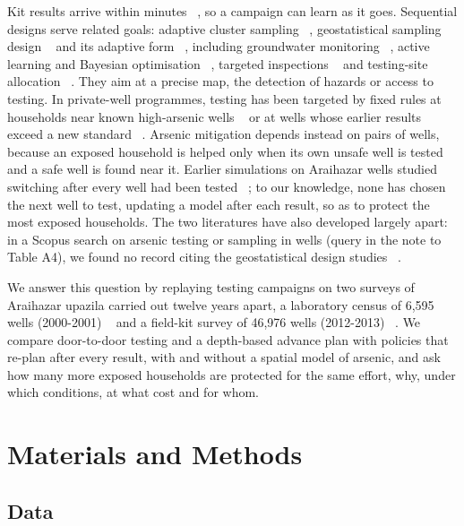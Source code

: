 \documentclass[sustainability,article,submit,pdftex,moreauthors]{Definitions/mdpi}
\begin{document}
Kit results arrive within minutes ~\cite{George2012}, so a campaign can learn as it goes. Sequential designs serve related goals: adaptive cluster sampling ~\cite{Thompson1990}, geostatistical sampling design ~\cite{Diggle2006,Yin2021} and its adaptive form ~\cite{Chipeta2016,Kabaghe2017}, including groundwater monitoring ~\cite{Lykkegaard2022}, active learning and Bayesian optimisation ~\cite{Settles2012,Garnett2012,Srinivas2012,Shahriari2016,Golovin2011}, targeted inspections ~\cite{Hino2018,Abernethy2018,Case2022} and testing-site allocation ~\cite{Hsiao2025}. They aim at a precise map, the detection of hazards or access to testing. In private-well programmes, testing has been targeted by fixed rules at households near known high-arsenic wells ~\cite{Flanagan2020} or at wells whose earlier results exceed a new standard ~\cite{ONeill2023}. Arsenic mitigation depends instead on pairs of wells, because an exposed household is helped only when its own unsafe well is tested and a safe well is found near it. Earlier simulations on Araihazar wells studied switching after every well had been tested ~\cite{Gelman2004,Jameel2021}; to our knowledge, none has chosen the next well to test, updating a model after each result, so as to protect the most exposed households. The two literatures have also developed largely apart: in a Scopus search on arsenic testing or sampling in wells (query in the note to Table A4), we found no record citing the geostatistical design studies ~\cite{Diggle2006,Chipeta2016,Kabaghe2017}.

We answer this question by replaying testing campaigns on two surveys of Araihazar upazila carried out twelve years apart, a laboratory census of 6,595 wells (2000-2001) ~\cite{vanGeen2003,Jameel2021data} and a field-kit survey of 46,976 wells (2012-2013) ~\cite{vanGeen2014,Huang2022,Knappett2024data}. We compare door-to-door testing and a depth-based advance plan with policies that re-plan after every result, with and without a spatial model of arsenic, and ask how many more exposed households are protected for the same effort, why, under which conditions, at what cost and for whom.

\section{Materials and Methods}

\subsection{Data}
\end{document}
